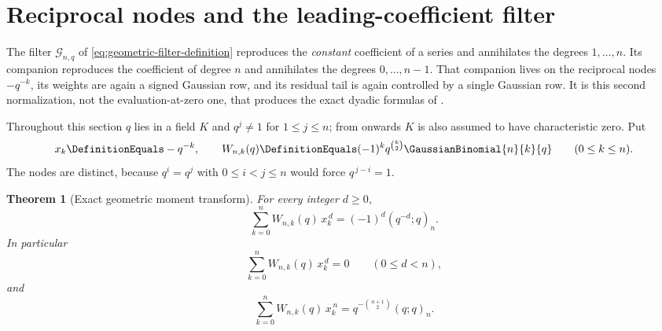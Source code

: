 \documentclass[11pt,a4paper,oneside,openany]{book}
\newtheorem{theorem}{Theorem}[chapter]
\theoremstyle{definition}
\theoremstyle{remark}
\begin{document}
\section{Reciprocal nodes and the leading-coefficient filter}

The filter $\mathcal G_{n,q}$ of \eqref{eq:geometric-filter-definition} reproduces the \emph{constant} coefficient of a series and annihilates the degrees $1,\ldots,n$.  Its companion reproduces the coefficient of degree $n$ and annihilates the degrees $0,\ldots,n-1$.  That companion lives on the reciprocal nodes $-q^{-k}$, its weights are again a signed Gaussian row, and its residual tail is again controlled by a single Gaussian row.  It is this second normalization, not the evaluation-at-zero one, that produces the exact dyadic formulas of .

Throughout this section $q$ lies in a field $K$ and $q^j\ne1$ for $1\le j\le n$; from  onwards $K$ is also assumed to have characteristic zero.  Put
\begin{equation}\label{eq:reciprocal-nodes-weights}
 x_k\DefinitionEquals-q^{-k},
 \qquad
 W_{n,k}(q)\DefinitionEquals(-1)^kq^{\binom k2}\GaussianBinomial{n}{k}{q}
 \qquad(0\le k\le n).
\end{equation}
The nodes are distinct, because $q^i=q^j$ with $0\le i<j\le n$ would force $q^{\,j-i}=1$.

\begin{theorem}[Exact geometric moment transform]\label{thm:geometric-moment-transform}
For every integer $d\ge0$,
\begin{equation}\label{eq:geometric-moment-all}
 \sum_{k=0}^{n}W_{n,k}(q)\,x_k^{\,d}
 =(-1)^d(q^{-d};q)_n.
\end{equation}
In particular
\begin{equation}\label{eq:geometric-moment-zero}
 \sum_{k=0}^{n}W_{n,k}(q)\,x_k^{\,d}=0
 \qquad(0\le d<n),
\end{equation}
and
\begin{equation}\label{eq:geometric-moment-top}
 \sum_{k=0}^{n}W_{n,k}(q)\,x_k^{\,n}
 =q^{-\binom{n+1}{2}}(q;q)_n.
\end{equation}
\end{theorem}
\end{document}
